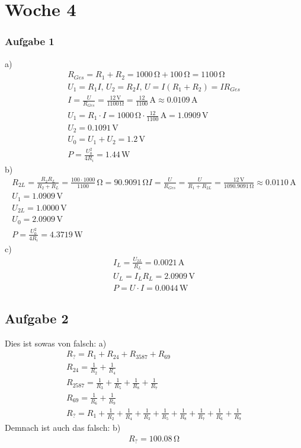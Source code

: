 \documentclass{article}
\begin{document}
\section*{Woche 4}
\subsubsection*{Aufgabe 1}
a)\begin{eqnarray*}
    R_{Ges}=R_1 + R_2 = 1000\,\mathrm{\Omega} + 100\,\mathrm{\Omega} = 1100\,\mathrm{\Omega}\\
    U_1 = R_1I,\,U_2=R_2I,\,U=I(R_1+R_2)=IR_{Ges}\\
    I = \frac{U}{R_{Ges}}=\frac{12\,\mathrm{V}}{1100\,\mathrm{\Omega}}= \frac{12}{1100}\,\mathrm{A}\approx 0.0109\,\mathrm{A}\\
    U_1 = R_1 \cdot I = 1000\,\mathrm{\Omega}\cdot \frac{12}{1100}\,\mathrm{A} = 1.0909\,\mathrm{V}\\
    U_2 = 0.1091\,\mathrm{V}\\
    U_0 = U_1 + U_2 = 1.2\,\mathrm{V}\\
    P = \frac{U_0^2}{4R_i} = 1.44\,\mathrm{W}
\end{eqnarray*}
b)\begin{eqnarray*}
    R_{2L} = \frac{R_2R_L}{R_2+R_L}=\frac{100\cdot 1000}{1100} \,\mathrm{\Omega}=90.9091\,\mathrm{\Omega}
    I = \frac{U}{R_{Ges}} = \frac{U}{R_1+R_{2L}} = \frac{12\,\mathrm{V}}{1090.9091\,\mathrm{\Omega}} \approx 0.0110\,\mathrm{A}\\
    U_1 = 1.0909\,\mathrm{V}\\
    U_{2L} = 1.0000\,\mathrm{V}\\
    U_{0} = 2.0909\,\mathrm{V}\\
    P = \frac{U_0^2}{4R_i} = 4.3719\,\mathrm{W}
\end{eqnarray*}
c)\begin{eqnarray*}
    I_L = \frac{U_{2L}}{R_L} = 0.0021\,\mathrm{A}\\
    U_L = I_LR_L = 2.0909\,\mathrm{V}\\
    P = U\cdot I = 0.0044\,\mathrm{W}
\end{eqnarray*}

\subsection*{Aufgabe 2}
Dies ist sowas von falsch:
a)\begin{eqnarray*}
    R_? = R_1 + R_{24} + R_{3587} + R_{69}\\
    R_{24} = \frac{1}{R_2} + \frac{1}{R_4}\\
    R_{2587} = \frac{1}{R_3} + \frac{1}{R_5} + \frac{1}{R_8} + \frac{1}{R_7}\\
    R_{69} = \frac{1}{R_6} + \frac{1}{R_9}\\
    R_? = R_1 + \frac{1}{R_2} + \frac{1}{R_4} + \frac{1}{R_3} + \frac{1}{R_5} + \frac{1}{R_8} + \frac{1}{R_7} + \frac{1}{R_6} + \frac{1}{R_9}
\end{eqnarray*}
Demnach ist auch das falsch:
b)\begin{eqnarray*}
    R_? = 100.08\,\mathrm{\Omega}
\end{eqnarray*}
\end{document}
